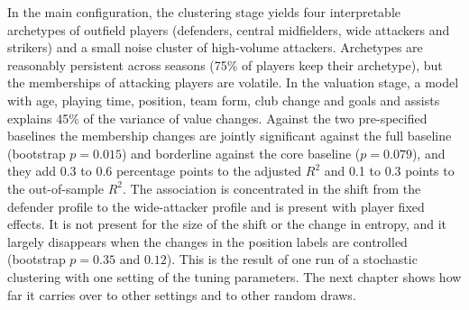 In the main configuration, the clustering stage yields four interpretable archetypes of outfield players (defenders, central midfielders, wide attackers and strikers) and a small noise cluster of high-volume attackers. Archetypes are reasonably persistent across seasons (75\% of players keep their archetype), but the memberships of attacking players are volatile. In the valuation stage, a model with age, playing time, position, team form, club change and goals and assists explains 45\% of the variance of value changes. Against the two pre-specified baselines the membership changes are jointly significant against the full baseline (bootstrap $p=0.015$) and borderline against the core baseline ($p=0.079$), and they add 0.3 to 0.6 percentage points to the adjusted $R^2$ and 0.1 to 0.3 points to the out-of-sample $R^2$. The association is concentrated in the shift from the defender profile to the wide-attacker profile and is present with player fixed effects. It is not present for the size of the shift or the change in entropy, and it largely disappears when the changes in the position labels are controlled (bootstrap $p=0.35$ and $0.12$). This is the result of one run of a stochastic clustering with one setting of the tuning parameters. The next chapter shows how far it carries over to other settings and to other random draws.
